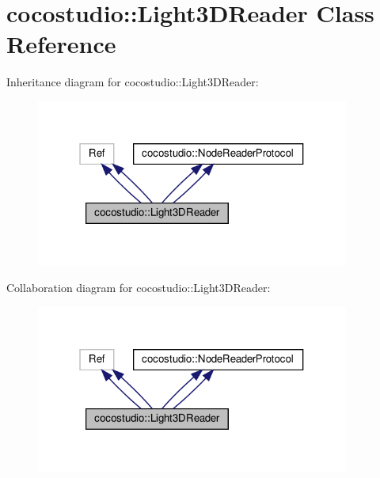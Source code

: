 \hypertarget{classcocostudio_1_1Light3DReader}{}\section{cocostudio\+:\+:Light3\+D\+Reader Class Reference}
\label{classcocostudio_1_1Light3DReader}


Inheritance diagram for cocostudio\+:\+:Light3\+D\+Reader\+:
\nopagebreak
\begin{figure}[H]
\begin{center}
\leavevmode
\includegraphics[width=292pt]{classcocostudio_1_1Light3DReader__inherit__graph}
\end{center}
\end{figure}


Collaboration diagram for cocostudio\+:\+:Light3\+D\+Reader\+:
\nopagebreak
\begin{figure}[H]
\begin{center}
\leavevmode
\includegraphics[width=292pt]{classcocostudio_1_1Light3DReader__coll__graph}
\end{center}
\end{figure}
